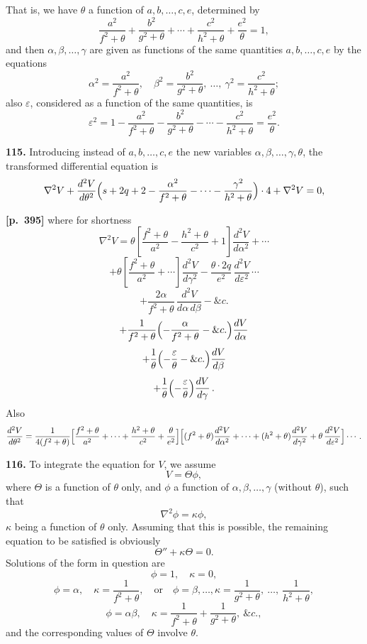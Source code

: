 \documentclass[11pt,a4paper]{article}
\begin{document}
That is, we have $\theta$ a function of $a, b, \ldots, c, e$, determined by
\[
\frac{a^{2}}{f^{2}+\theta} + \frac{b^{2}}{g^{2}+\theta} + \cdots + \frac{c^{2}}{h^{2}+\theta} + \frac{e^{2}}{\theta} = 1,
\]
and then $\alpha, \beta, \ldots, \gamma$ are given as functions of the same quantities $a, b, \ldots, c, e$ by the equations
\[
\alpha^{2} = \frac{a^{2}}{f^{2}+\theta},\quad \beta^{2} = \frac{b^{2}}{g^{2}+\theta},\ \ldots,\ \gamma^{2} = \frac{c^{2}}{h^{2}+\theta};
\]
also $\varepsilon$, considered as a function of the same quantities, is
\[
\varepsilon^{2} = 1 - \frac{a^{2}}{f^{2}+\theta} - \frac{b^{2}}{g^{2}+\theta} - \cdots - \frac{c^{2}}{h^{2}+\theta} = \frac{e^{2}}{\theta}.
\]

\textbf{115.} Introducing instead of $a, b, \ldots, c, e$ the new variables $\alpha, \beta, \ldots, \gamma, \theta$, the transformed differential equation is
\[
\nabla^{2}V + \frac{d^{2}V}{d\theta^{2}}\Bigl(s + 2q + 2 - \frac{\alpha^{2}}{f^{2}+\theta} - \cdots - \frac{\gamma^{2}}{h^{2}+\theta}\Bigr)\cdot 4 + \nabla^{2}V = 0,
\]

\noindent\textbf{[p.~395]}\quad
where for shortness
\[
\nabla^{2}V = \theta\left[\frac{f^{2} + \theta}{a^{2}} - \frac{h^{2}+\theta}{c^{2}} + 1\right]\frac{d^{2}V}{d\alpha^{2}} + \cdots
\]
\[
+ \theta\left[\frac{f^{2} + \theta}{a^{2}} + \cdots\right]\frac{d^{2}V}{d\gamma^{2}} - \frac{\theta\cdot 2q}{e^{2}}\,\frac{d^{2}V}{d\varepsilon^{2}}\,\cdots
\]
\[
+ \frac{2\alpha}{f^{2}+\theta}\,\frac{d^{2}V}{d\alpha\,d\beta} - \&c.
\]
\[
+ \frac{1}{f^{2}+\theta}\Bigl(-\frac{\alpha}{f^{2}+\theta} - \&c.\Bigr)\frac{dV}{d\alpha}
\]
\[
+ \frac{1}{\theta}\Bigl(-\frac{\varepsilon}{\theta} - \&c.\Bigr)\frac{dV}{d\beta}
\]
\[
+ \frac{1}{\theta}\Bigl(-\frac{\varepsilon}{\theta}\Bigr)\frac{dV}{d\gamma}\,.
\]
Also
\[
\frac{d^{2}V}{d\theta^{2}} = \frac{1}{4(f^{2}+\theta)}\Bigl[\frac{f^{2}+\theta}{a^{2}} + \cdots + \frac{h^{2}+\theta}{c^{2}} + \frac{\theta}{e^{2}}\Bigr]\Bigl[(f^{2}+\theta)\frac{d^{2}V}{d\alpha^{2}} + \cdots + (h^{2}+\theta)\frac{d^{2}V}{d\gamma^{2}} + \theta\,\frac{d^{2}V}{d\varepsilon^{2}}\Bigr]\cdots\,.
\]

\textbf{116.} To integrate the equation for $V$, we assume
\[
V = \Theta\phi,
\]
where $\Theta$ is a function of $\theta$ only, and $\phi$ a function of $\alpha, \beta, \ldots, \gamma$ (without $\theta$), such that
\[
\nabla^{2}\phi = \kappa\phi,
\]
$\kappa$ being a function of $\theta$ only. Assuming that this is possible, the remaining equation to be satisfied is obviously
\[
\Theta'' + \kappa\Theta = 0.
\]
Solutions of the form in question are
\[
\phi = 1,\quad \kappa = 0,
\]
\[
\phi = \alpha,\quad \kappa = \frac{1}{f^{2}+\theta},\quad \text{or} \quad \phi = \beta, \ldots, \kappa = \frac{1}{g^{2}+\theta},\ \ldots,\ \frac{1}{h^{2}+\theta},
\]
\[
\phi = \alpha\beta,\quad \kappa = \frac{1}{f^{2}+\theta} + \frac{1}{g^{2}+\theta},\ \&c.,
\]
and the corresponding values of $\Theta$ involve $\theta$.
\end{document}
